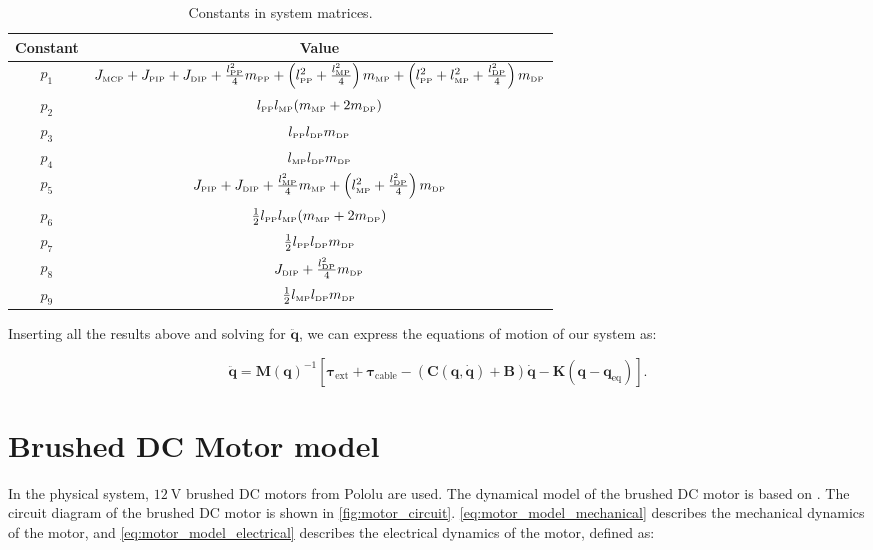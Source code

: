 \begin{table}%
    \caption{Constants in system matrices.}
    \label{tab:dynamics_params}
    \centering
    \begin{tabular}{cc}
        \toprule
        Constant & Value \\
        \midrule
        $p_1$ & $J_{{\scriptscriptstyle\mathrm{MCP}}} + J_{{\scriptscriptstyle\mathrm{PIP}}} + J_{{\scriptscriptstyle\mathrm{DIP}}} + \frac{l_{{\scriptscriptstyle\mathrm{PP}}}^2}{4} m_{{\scriptscriptstyle\mathrm{PP}}} + \left(l_{{\scriptscriptstyle\mathrm{PP}}}^2 + \frac{l_{{\scriptscriptstyle\mathrm{MP}}}^2}{4}\right) m_{{\scriptscriptstyle\mathrm{MP}}} + \left(l_{{\scriptscriptstyle\mathrm{PP}}}^2 + l_{{\scriptscriptstyle\mathrm{MP}}}^2 + \frac{l_{{\scriptscriptstyle\mathrm{DP}}}^2}{4}\right) m_{{\scriptscriptstyle\mathrm{DP}}}$ \\
        $p_2$ & $l_{{\scriptscriptstyle\mathrm{PP}}}l_{{\scriptscriptstyle\mathrm{MP}}}(m_{{\scriptscriptstyle\mathrm{MP}}} + 2 m_{{\scriptscriptstyle\mathrm{DP}}})$ \\
        $p_3$ & $l_{{\scriptscriptstyle\mathrm{PP}}}l_{{\scriptscriptstyle\mathrm{DP}}}m_{{\scriptscriptstyle\mathrm{DP}}}$ \\
        $p_4$ & $l_{{\scriptscriptstyle\mathrm{MP}}}l_{{\scriptscriptstyle\mathrm{DP}}}m_{{\scriptscriptstyle\mathrm{DP}}}$ \\
        $p_5$ & $J_{{\scriptscriptstyle\mathrm{PIP}}} + J_{{\scriptscriptstyle\mathrm{DIP}}} + \frac{l_{{\scriptscriptstyle\mathrm{MP}}}^2}{4} m_{{\scriptscriptstyle\mathrm{MP}}} + \left(l_{{\scriptscriptstyle\mathrm{MP}}}^2 + \frac{l_{{\scriptscriptstyle\mathrm{DP}}}^2}{4}\right) m_{{\scriptscriptstyle\mathrm{DP}}}$ \\
        $p_6$ & $\frac{1}{2} l_{{\scriptscriptstyle\mathrm{PP}}} l_{{\scriptscriptstyle\mathrm{MP}}} (m_{{\scriptscriptstyle\mathrm{MP}}} + 2 m_{{\scriptscriptstyle\mathrm{DP}}})$ \\
        $p_7$ & $\frac{1}{2} l_{{\scriptscriptstyle\mathrm{PP}}} l_{{\scriptscriptstyle\mathrm{DP}}} m_{{\scriptscriptstyle\mathrm{DP}}}$ \\
        $p_8$ & $J_{{\scriptscriptstyle\mathrm{DIP}}} + \frac{l_{{\scriptscriptstyle\mathrm{DP}}}^2}{4} m_{{\scriptscriptstyle\mathrm{DP}}}$ \\
        $p_9$ & $\frac{1}{2} l_{{\scriptscriptstyle\mathrm{MP}}} l_{{\scriptscriptstyle\mathrm{DP}}} m_{{\scriptscriptstyle\mathrm{DP}}}$ \\
        \bottomrule
    \end{tabular}
\end{table}

Inserting all the results above and solving for $\ddot{\mathbf{q}}$, we can express the equations of motion of our system as:

\begin{equation}
    \label{eq:modelling_equations_of_motion}
    \ddot{\mathbf{q}} = \mathbf{M}(\mathbf{q})^{-1} \left[\boldsymbol{\tau}_{\text{ext}} + \boldsymbol{\tau}_{\text{cable}} - \left(\mathbf{C}(\mathbf{q}, \dot{\mathbf{q}}) + \mathbf{B}\right)\dot{\mathbf{q}} - \mathbf{K} \left(\mathbf{q} - \mathbf{q}_{\text{eq}}\right)\right].
\end{equation}

\section{Brushed DC Motor model}%
\label{sec:brushed_dc_motor_model}
In the physical system, $\SI{12}{\volt}$ brushed DC motors from Pololu \parencite{Pololu751} are used. The dynamical model of the brushed DC motor is based on \cite{rahmanMathematicalModelBrushed2021}. The circuit diagram of the brushed DC motor is shown in \cref{fig:motor_circuit}. \cref{eq:motor_model_mechanical} describes the mechanical dynamics of the motor, and \cref{eq:motor_model_electrical} describes the electrical dynamics of the motor, defined as:

